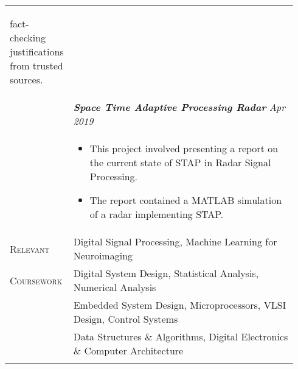 \documentclass[letterpaper, 10pt, oneside]{article}
\newcommand{\stitle}[1]{\normalsize{\textsc{#1}}}
\newcommand{\bdit}[1]{\textit{\textbf{#1}}}
\begin{document}
\begin{longtable}{@{} p{0.14\linewidth} p{0.8\linewidth}}
{\begin{itemize}[leftmargin=*, itemsep=-0.88ex]
                                fact-checking justifications from trusted sources.
                        \end{itemize}
                    }  
\\
                  & \bdit{Space Time Adaptive Processing Radar} \hfill \textit{Apr 2019} \\
                  & \parbox{0.8\textwidth}{
                        \begin{itemize}[leftmargin=*, itemsep=-0.88ex]
                            \item This project involved presenting a report on the current state of STAP in Radar Signal Processing.
                            \item The report contained a MATLAB simulation of a radar implementing STAP.
                        \end{itemize}
                    }  
\\


\stitle{Relevant}   & Digital Signal Processing, Machine Learning for Neuroimaging \\
\stitle{Coursework} & Digital System Design, Statistical Analysis, Numerical Analysis \\
                    & Embedded System Design, Microprocessors, VLSI Design, Control Systems \\
                    & Data Structures \& Algorithms, Digital Electronics \& Computer Architecture \\
\\




%



\end{longtable}
\end{document}
